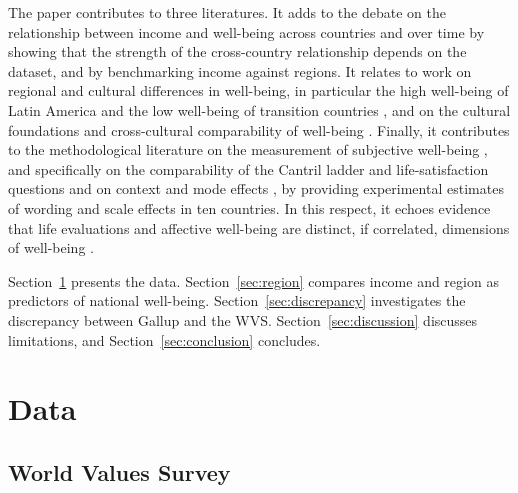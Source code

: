 \documentclass[12pt]{article}
\begin{document}
The paper contributes to three literatures. It adds to the debate on the relationship between income and well-being across countries and over time \citep{easterlin_does_1974,easterlin_happiness_2010,stevenson_economic_2008,deaton_income_2008,jebb_happiness_2018,proto_life_2015,powdthavee_top_2017,pirla_income_2025} by showing that the strength of the cross-country relationship depends on the dataset, and by benchmarking income against regions. It relates to work on regional and cultural differences in well-being, in particular the high well-being of Latin America \citep{graham_paradox_2009,rojas_handbook_2016} and the low well-being of transition countries \citep{guriev_unhappiness_2009}, and on the cultural foundations and cross-cultural comparability of well-being \citep{diener_culture_2000,exton_comparing_2015,senik_french_2014,conzo_cultural_2017}. Finally, it contributes to the methodological literature on the measurement of subjective well-being \citep{kahneman_developments_2006,oecd_guidelines_2013,stone_subjective_2013,bond_sad_2019,kaiser_scientific_2022}, and specifically on the comparability of the Cantril ladder and life-satisfaction questions \citep{bjornskov_how_2010,nilsson_cantril_2024} and on context and mode effects \citep{deaton_understanding_2016,dolan_happy_2016}, by providing experimental estimates of wording and scale effects in ten countries. In this respect, it echoes evidence that life evaluations and affective well-being are distinct, if correlated, dimensions of well-being \citep{berlin_association_2019}.

Section~\ref{sec:data} presents the data. Section~\ref{sec:region} compares income and region as predictors of national well-being. Section~\ref{sec:discrepancy} investigates the discrepancy between Gallup and the WVS. Section~\ref{sec:discussion} discusses limitations, and Section~\ref{sec:conclusion} concludes.

\section{Data}\label{sec:data}
\subsection{World Values Survey}\label{subsec:wvs}
\end{document}
